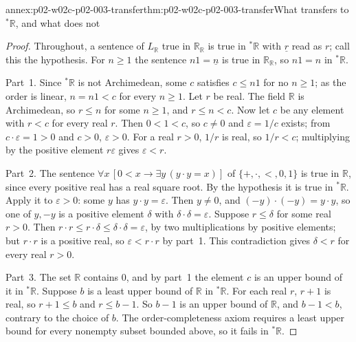 \begin{annexitem}{annex:p02-w02c-p02-003-transfer}{thm:p02-w02c-p02-003-transfer}{What transfers to \({}^*\mathbb R\), and what does not}
\begin{proof}
Throughout, a sentence of \(L_{\mathbb R}\) true in \(\mathbb R_{\mathbb R}\)
is true in \({}^*\mathbb R\) with \(\underline r\) read as \(r\); call this
the hypothesis.  For \(n\geq1\) the sentence \(n1=\underline n\) is true
in \(\mathbb R_{\mathbb R}\), so \(n1=n\) in \({}^*\mathbb R\).

Part~1.  Since \({}^*\mathbb R\) is not Archimedean, some \(c\) satisfies
\(c\leq n1\) for no \(n\geq1\); as the order is linear, \(n=n1<c\) for
every \(n\geq1\).  Let \(r\) be real.  The field \(\mathbb R\) is
Archimedean, so \(r\leq n\) for some \(n\geq1\), and \(r\leq n<c\).  Now let
\(c\) be any element with \(r<c\) for every real \(r\).  Then \(0<1<c\), so
\(c\neq0\) and \(\varepsilon=1/c\) exists; from
\(c\cdot\varepsilon=1>0\) and \(c>0\), \(\varepsilon>0\).  For a real
\(r>0\), \(1/r\) is real, so \(1/r<c\); multiplying by the positive
element \(r\varepsilon\) gives \(\varepsilon<r\).

Part~2.  The sentence
\(\forall x\,[0<x\to\exists y\,(y\cdot y=x)]\) of
\(\{+,\cdot,<,0,1\}\) is true in \(\mathbb R\), since every positive real
has a real square root.  By the hypothesis it is true in
\({}^*\mathbb R\).  Apply it to \(\varepsilon>0\): some \(y\) has
\(y\cdot y=\varepsilon\).  Then \(y\neq0\), and
\((-y)\cdot(-y)=y\cdot y\), so one of \(y,-y\) is a positive element
\(\delta\) with \(\delta\cdot\delta=\varepsilon\).  Suppose \(r\leq\delta\)
for some real \(r>0\).  Then \(r\cdot r\leq r\cdot\delta\leq\delta\cdot
\delta=\varepsilon\), by two multiplications by positive elements; but
\(r\cdot r\) is a positive real, so \(\varepsilon<r\cdot r\) by part~1.
This contradiction gives \(\delta<r\) for every real \(r>0\).

Part~3.  The set \(\mathbb R\) contains \(0\), and by part~1 the element
\(c\) is an upper bound of it in \({}^*\mathbb R\).  Suppose \(b\) is a
least upper bound of \(\mathbb R\) in \({}^*\mathbb R\).  For each real
\(r\), \(r+1\) is real, so \(r+1\leq b\) and \(r\leq b-1\).  So \(b-1\) is
an upper bound of \(\mathbb R\), and \(b-1<b\), contrary to the choice of
\(b\).  The order-completeness axiom requires a least upper bound for
every nonempty subset bounded above, so it fails in \({}^*\mathbb R\).


\end{proof}
\end{annexitem}
